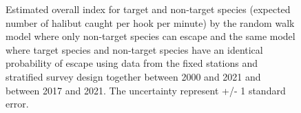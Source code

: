 \documentclass[12pt]{article}\usepackage[]{graphicx}\usepackage[]{color}
\begin{document}
\begin{appendices}
\begin{figure}[htb]
{\centering {}  

}

\caption{Estimated overall index for target and non-target species (expected number of halibut caught per hook per minute) by the random walk model where only non-target species can escape and the same model where target species and non-target species have an identical probability of escape using data from the fixed stations and stratified survey design together between 2000 and 2021 and between 2017 and 2021. The uncertainty represent +/- 1 standard error.}\label{fig:new-target-indices}
\end{figure}
\begin{figure}[htb]

{\centering {} 

}
\end{figure}
\end{appendices}
\end{document}
